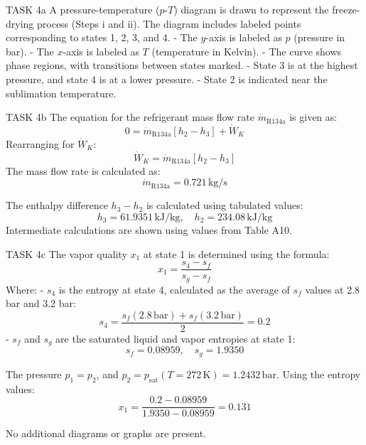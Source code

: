 TASK 4a  
A pressure-temperature (\( p \)-\( T \)) diagram is drawn to represent the freeze-drying process (Steps i and ii). The diagram includes labeled points corresponding to states 1, 2, 3, and 4.  
- The \( y \)-axis is labeled as \( p \) (pressure in bar).  
- The \( x \)-axis is labeled as \( T \) (temperature in Kelvin).  
- The curve shows phase regions, with transitions between states marked.  
- State 3 is at the highest pressure, and state 4 is at a lower pressure.  
- State 2 is indicated near the sublimation temperature.  

TASK 4b  
The equation for the refrigerant mass flow rate \( \dot{m}_{\text{R134a}} \) is given as:  
\[
0 = \dot{m}_{\text{R134a}} \left[ h_2 - h_3 \right] + \dot{W}_K
\]  
Rearranging for \( \dot{W}_K \):  
\[
\dot{W}_K = \dot{m}_{\text{R134a}} \left[ h_2 - h_3 \right]
\]  
The mass flow rate is calculated as:  
\[
\dot{m}_{\text{R134a}} = 0.721 \, \text{kg/s}
\]  

The enthalpy difference \( h_3 - h_2 \) is calculated using tabulated values:  
\[
h_3 = 61.9351 \, \text{kJ/kg}, \quad h_2 = 234.08 \, \text{kJ/kg}
\]  
Intermediate calculations are shown using values from Table A10.  

TASK 4c  
The vapor quality \( x_1 \) at state 1 is determined using the formula:  
\[
x_1 = \frac{s_4 - s_f}{s_g - s_f}
\]  
Where:  
- \( s_4 \) is the entropy at state 4, calculated as the average of \( s_f \) values at 2.8 bar and 3.2 bar:  
\[
s_4 = \frac{s_f(2.8 \, \text{bar}) + s_f(3.2 \, \text{bar})}{2} = 0.2
\]  
- \( s_f \) and \( s_g \) are the saturated liquid and vapor entropies at state 1:  
\[
s_f = 0.08959, \quad s_g = 1.9350
\]  

The pressure \( p_1 = p_2 \), and \( p_2 = p_{\text{sat}}(T = 272 \, \text{K}) = 1.2432 \, \text{bar} \).  
Using the entropy values:  
\[
x_1 = \frac{0.2 - 0.08959}{1.9350 - 0.08959} = 0.131
\]  

No additional diagrams or graphs are present.